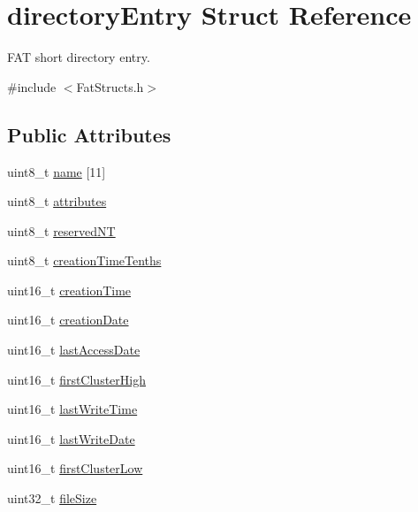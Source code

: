 \hypertarget{structdirectory_entry}{}\section{directory\+Entry Struct Reference}
\label{structdirectory_entry}


F\+A\+T short directory entry.  




{\ttfamily \#include $<$Fat\+Structs.\+h$>$}

\subsection*{Public Attributes}
\begin{DoxyCompactItemize}
\item 
uint8\+\_\+t \hyperlink{structdirectory_entry_a05dc993ea55a1a742de5970541a31ecb}{name} \mbox{[}11\mbox{]}
\item 
uint8\+\_\+t \hyperlink{structdirectory_entry_a16c6cde55c8175c90935c386f1cfb21a}{attributes}
\item 
uint8\+\_\+t \hyperlink{structdirectory_entry_afe7d00be85f3b78549b21610050da52b}{reserved\+N\+T}
\item 
uint8\+\_\+t \hyperlink{structdirectory_entry_aa5e1ce5b411b88f005b28a3e7c7c5af6}{creation\+Time\+Tenths}
\item 
uint16\+\_\+t \hyperlink{structdirectory_entry_a622bfa70c2cd9006108d7473d737a953}{creation\+Time}
\item 
uint16\+\_\+t \hyperlink{structdirectory_entry_a7b43372794655fe6604d3c17c02302fe}{creation\+Date}
\item 
uint16\+\_\+t \hyperlink{structdirectory_entry_abca70dc5c5fcbe199fd78df010111331}{last\+Access\+Date}
\item 
uint16\+\_\+t \hyperlink{structdirectory_entry_a3b492598b2b05e8425d2a500443613bd}{first\+Cluster\+High}
\item 
uint16\+\_\+t \hyperlink{structdirectory_entry_a7bab435322d1928f66fbce53ee1f402d}{last\+Write\+Time}
\item 
uint16\+\_\+t \hyperlink{structdirectory_entry_a12b2e7cf87482a942a0b5d3df6c51468}{last\+Write\+Date}
\item 
uint16\+\_\+t \hyperlink{structdirectory_entry_a74bd660417a9c3501eae353326c14bb9}{first\+Cluster\+Low}
\item 
uint32\+\_\+t \hyperlink{structdirectory_entry_ac2445d99b50f925f662952e0ccd26a02}{file\+Size}
\end{DoxyCompactItemize}


